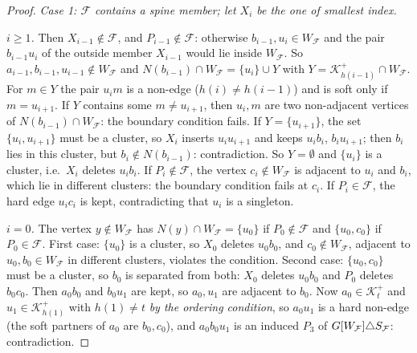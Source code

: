 \begin{proof}
\emph{Case 1: $\mathcal F$ contains a spine member; let $X_i$ be the one of smallest index.}

\emph{$i\ge1$.} Then $X_{i-1}\notin\mathcal F$, and $P_{i-1}\notin\mathcal F$: otherwise $b_{i-1},u_i\in W_{\mathcal F}$ and the pair $b_{i-1}u_i$ of the outside member $X_{i-1}$ would lie inside $W_{\mathcal F}$. So $a_{i-1},b_{i-1},u_{i-1}\notin W_{\mathcal F}$ and $N(b_{i-1})\cap W_{\mathcal F}=\{u_i\}\cup Y$ with $Y=\mathcal K^+_{h(i-1)}\cap W_{\mathcal F}$. For $m\in Y$ the pair $u_im$ is a non-edge ($h(i)\ne h(i-1)$) and is soft only if $m=u_{i+1}$. If $Y$ contains some $m\ne u_{i+1}$, then $u_i,m$ are two non-adjacent vertices of $N(b_{i-1})\cap W_{\mathcal F}$: the boundary condition fails. If $Y=\{u_{i+1}\}$, the set $\{u_i,u_{i+1}\}$ must be a cluster, so $X_i$ inserts $u_iu_{i+1}$ and keeps $u_ib_i$, $b_iu_{i+1}$; then $b_i$ lies in this cluster, but $b_i\notin N(b_{i-1})$: contradiction. So $Y=\emptyset$ and $\{u_i\}$ is a cluster, i.e.\ $X_i$ deletes $u_ib_i$. If $P_i\notin\mathcal F$, the vertex $c_i\notin W_{\mathcal F}$ is adjacent to $u_i$ and $b_i$, which lie in different clusters: the boundary condition fails at $c_i$. If $P_i\in\mathcal F$, the hard edge $u_ic_i$ is kept, contradicting that $u_i$ is a singleton.

\emph{$i=0$.} The vertex $y\notin W_{\mathcal F}$ has $N(y)\cap W_{\mathcal F}=\{u_0\}$ if $P_0\notin\mathcal F$ and $\{u_0,c_0\}$ if $P_0\in\mathcal F$. First case: $\{u_0\}$ is a cluster, so $X_0$ deletes $u_0b_0$, and $c_0\notin W_{\mathcal F}$, adjacent to $u_0,b_0\in W_{\mathcal F}$ in different clusters, violates the condition. Second case: $\{u_0,c_0\}$ must be a cluster, so $b_0$ is separated from both: $X_0$ deletes $u_0b_0$ and $P_0$ deletes $b_0c_0$. Then $a_0b_0$ and $b_0u_1$ are kept, so $a_0,u_1$ are adjacent to $b_0$. Now $a_0\in \mathcal K_t^+$ and $u_1\in \mathcal K^+_{h(1)}$ with $h(1)\ne t$ \emph{by the ordering condition}, so $a_0u_1$ is a hard non-edge (the soft partners of $a_0$ are $b_0,c_0$), and $a_0b_0u_1$ is an induced $P_3$ of $G[W_{\mathcal F}]\triangle S_{\mathcal F}$: contradiction.


\end{proof}
